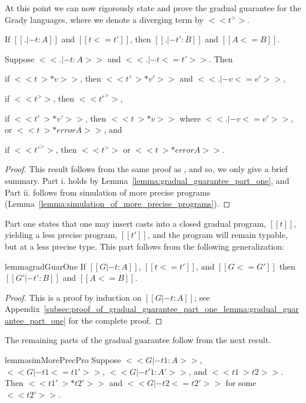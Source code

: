 At this point we can now rigorously state and prove the gradual
guarantee for the Grady languages, where we denote a diverging term by
$<<t ^>>$.
\begin{theorem}
  \label{thm:gradual_guarantee} 
  \begin{enumR}
  \item[] 
  \item If $[[. |- t : A]]$ and $[[t <= t']]$, then $[[. |- t' : B]]$ and $[[A <= B]]$.
  \item Suppose $<<. |- t : A>>$ and $<<. |- t <= t'>>$. Then
    \begin{enumA}
    \item if $<<t ~>* v>>$, then $<<t' ~>* v'>>$ and $<<. |- v <= v'>>$,
    \item if $<<t ^>>$, then $<<t' ^>>$,
    \item if $<<t' ~>* v'>>$, then $<<t ~>* v>>$ where $<<. |- v <= v'>>$, or $<<t ~>* error A>>$, and
    \item if $<<t' ^>>$, then $<<t ^>>$ or $<<t ~>* error A>>$.
    \end{enumA}
  \end{enumR}
\end{theorem}
\begin{proof}
  This result follows from the same proof as \cite{Siek:2015}, and so,
  we only give a brief summary.  Part i. holds by
  Lemma~\ref{lemma:gradual_guarantee_part_one}, and Part ii. follows
  from simulation of more precise programs
  (Lemma~\ref{lemma:simulation_of_more_precise_programs}).
\end{proof}
Part one states that one may insert casts into a closed gradual
program, $[[t]]$, yielding a less precise program, $[[t']]$, and the
program will remain typable, but at a less precise type.  This part
follows from the following generalization:
\begin{restatable}{lemma}{gradGuarOne}
  \label{lemma:gradual_guarantee_part_one}
  If $[[G |- t : A]]$, $[[t <= t']]$, and $[[G <= G']]$ then $[[G' |- t' : B]]$ and $[[A <= B]]$.
\end{restatable}
\begin{proof}
  This is a proof by induction on $[[G |- t : A]]$; see
  Appendix~\ref{subsec:proof_of_gradual_guarantee_part_one_lemma:gradual_guarantee_part_one}
  for the complete proof.
\end{proof}
\noindent
The remaining parts of the gradual guarantee follow from the next
result.
\begin{restatable}{lemma}{simMorePrecPro}
  \label{lemma:simulation_of_more_precise_programs}
  Suppose $<<G |- t1 : A>>$, $<<G |- t1 <= t1'>>$, $<<G |- t'1 : A'>>$, and $<<t1 ~> t2>>$.
  Then $<<t1' ~>* t2'>>$ and $<<G |- t2 <= t2'>>$ for some $<<t2'>>$.
\end{restatable}
